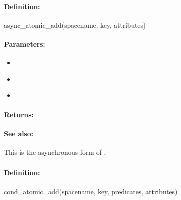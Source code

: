 \paragraph{Definition:}
\begin{rubycode}
async_atomic_add(spacename, key, attributes)
\end{rubycode}

\paragraph{Parameters:}
\begin{itemize}[noitemsep]
\item {}\\

\item {}\\

\item {}\\

\end{itemize}

\paragraph{Returns:}


\paragraph{See also:}  This is the asynchronous form of .

\pagebreak
\subsubsection{}
\label{api:ruby:cond_atomic_add}


\paragraph{Definition:}
\begin{rubycode}
cond_atomic_add(spacename, key, predicates, attributes)
\end{rubycode}

